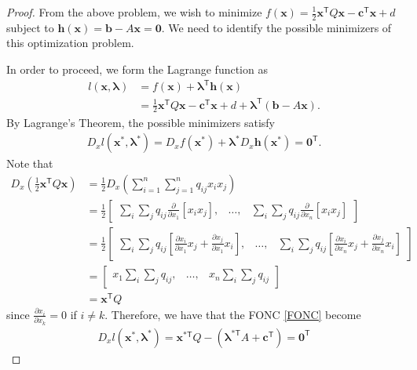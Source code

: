 \documentclass[12pt]{article}
\theoremstyle{definition}
\newcommand{\vc}[1]{\boldsymbol{#1}}
\newcommand{\tran}{\mathsf{T}}
\begin{document}
\begin{proof}
  From the above problem, we wish to minimize $f(\vc{x}) = \frac{1}{2} \vc{x}^\tran Q \vc{x} - \vc{c}^\tran \vc{x} + d$
  subject to $\vc{h}(\vc{x}) = \vc{b} - A\vc{x}= \vc{0}$. We need to identify the possible
  minimizers of this optimization problem.

  In order to proceed, we form the Lagrange function as
  \begin{align*}
    l(\vc{x}, \vc{\lambda}) &= f(\vc{x}) + \vc{\lambda}^\tran \vc{h}(\vc{x}) \\ &= \frac{1}{2} \vc{x}^\tran Q \vc{x} - \vc{c}^\tran \vc{x} + d + \vc{\lambda}^\tran(\vc{b} - A\vc{x}).
  \end{align*}
  By Lagrange's Theorem, the possible minimizers satisfy
  \begin{align}\label{FONC}
    D_x l(\vc{x}^{*}, \vc{\lambda}^{*}) = D_x f(\vc{x}^{*}) + \vc{\lambda}^{*}D_x \vc{h}(\vc{x}^{*}) = \vc{0}^\tran.
  \end{align}
  Note that
  \begin{align*}
    D_x \left(\frac{1}{2} \vc{x}^\tran Q \vc{x}\right) &= \frac{1}{2} D_x \left(\sum_{i=1}^n \sum_{j=1}^n q_{ij} x_i x_j\right) \\
    &= \frac{1}{2} \begin{bmatrix}\sum_{i}\sum_{j} q_{ij} \frac{\partial}{\partial x_1}\left[x_ix_j\right], & \dots, & \sum_{i}\sum_{j} q_{ij} \frac{\partial}{\partial x_n}\left[x_ix_j\right]\end{bmatrix} \\
    &= \frac{1}{2} \begin{bmatrix}\sum_{i}\sum_{j} q_{ij} \left[\frac{\partial x_i}{\partial x_1}x_j + \frac{\partial x_j}{\partial x_1}x_i\right], & \dots, & \sum_{i}\sum_{j} q_{ij}\left[\frac{\partial x_i}{\partial x_n}x_j + \frac{\partial x_j}{\partial x_n}x_i\right] \end{bmatrix} \\
    &= \begin{bmatrix}x_1 \sum_{i}\sum_{j} q_{ij}, & \dots, & x_n\sum_{i}\sum_{j} q_{ij} \end{bmatrix} \\
    &= \vc{x}^\tran Q
  \end{align*}
  since $\frac{\partial x_i}{\partial x_k} = 0$ if $i\neq k$. Therefore, we have that the FONC \eqref{FONC} become
  \begin{align*}
    D_x l(\vc{x}^{*}, \vc{\lambda}^{*}) = \vc{x}^{*\tran} Q - \left(\vc{\lambda}^{*\tran} A + \vc{c}^\tran\right) = \vc{0}^\tran

\end{align*}
\end{proof}
\end{document}
